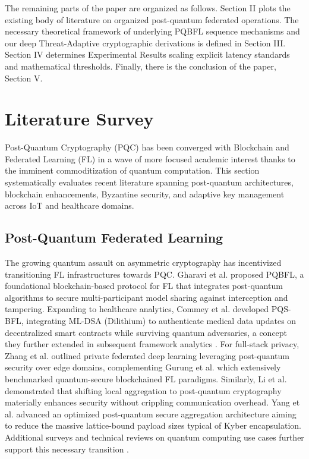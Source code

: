 \documentclass[journal, 10pt, twocolumn]{IEEEtran}
\begin{document}
The remaining parts of the paper are organized as follows. Section II plots the existing body of literature on organized post-quantum federated operations. The necessary theoretical framework of underlying PQBFL sequence mechanisms and our deep Threat-Adaptive cryptographic derivations is defined in Section III. Section IV determines Experimental Results scaling explicit latency standards and mathematical thresholds. Finally, there is the conclusion of the paper, Section V.

\section{Literature Survey}
Post-Quantum Cryptography (PQC) has been converged with Blockchain and Federated Learning (FL) in a wave of more focused academic interest thanks to the imminent commoditization of quantum computation. This section systematically evaluates recent literature spanning post-quantum architectures, blockchain enhancements, Byzantine security, and adaptive key management across IoT and healthcare domains.

\subsection{Post-Quantum Federated Learning}
The growing quantum assault on asymmetric cryptography has incentivized transitioning FL infrastructures towards PQC. Gharavi et al. \cite{gharavi2025} proposed PQBFL, a foundational blockchain-based protocol for FL that integrates post-quantum algorithms to secure multi-participant model sharing against interception and tampering. Expanding to healthcare analytics, Commey et al. \cite{commey2025_pqsbfl} developed PQS-BFL, integrating ML-DSA (Dilithium) to authenticate medical data updates on decentralized smart contracts while surviving quantum adversaries, a concept they further extended in subsequent framework analytics \cite{commey2025_health}. For full-stack privacy, Zhang et al. \cite{zhang2025} outlined private federated deep learning leveraging post-quantum security over edge domains, complementing Gurung et al. \cite{gurung2024} which extensively benchmarked quantum-secure blockchained FL paradigms. Similarly, Li et al. \cite{li2024} demonstrated that shifting local aggregation to post-quantum cryptography materially enhances security without crippling communication overhead. Yang et al. \cite{yang2023_secureagg} advanced an optimized post-quantum secure aggregation architecture aiming to reduce the massive lattice-bound payload sizes typical of Kyber encapsulation. Additional surveys and technical reviews on quantum computing use cases further support this necessary transition \cite{hlatshwayo2026, anon_pdf1, anon_survey_qsafe}.
\end{document}
